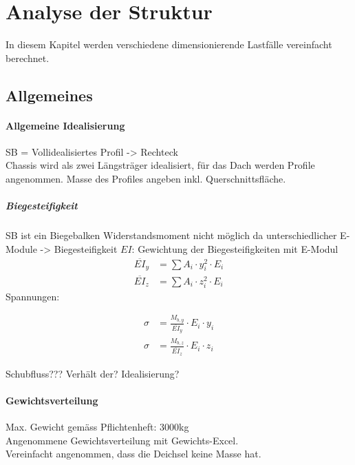 \section{Analyse der Struktur}
In diesem Kapitel werden verschiedene dimensionierende Lastfälle vereinfacht berechnet.

\subsection{Allgemeines}

\paragraph{Allgemeine Idealisierung}
SB = Vollidealisiertes Profil -> Rechteck\\
Chassis wird als zwei Längsträger idealisiert, für das Dach werden Profile angenommen. Masse des Profiles angeben inkl. Querschnittsfläche.

\subparagraph{Biegesteifigkeit}
SB ist ein Biegebalken
Widerstandsmoment nicht möglich da unterschiedlicher E-Module -> Biegesteifigkeit $EI$: Gewichtung der Biegesteifigkeiten mit E-Modul
\begin{equation}
  \label{eq:1}
  \begin{split}
    \overline{EI}_y &= \sum A_i \cdot y_i^2 \cdot E_i\\
    \overline{EI}_z &= \sum A_i \cdot z_i^2 \cdot E_i
  \end{split}
\end{equation}
Spannungen:

\begin{equation}
  \label{eq:2}
  \begin{split}
    \sigma &= \frac{M_{b,y}}{\overline{EI}_y}\cdot E_i \cdot y_i\\
    \sigma &= \frac{M_{b,z}}{\overline{EI}_z}\cdot E_i \cdot z_i
  \end{split}
\end{equation}

Schubfluss??? Verhält der? Idealisierung?

\paragraph{Gewichtsverteilung}
Max. Gewicht gemäss Pflichtenheft: 3000kg\\
Angenommene Gewichtsverteilung mit Gewichts-Excel.\\
Vereinfacht angenommen, dass die Deichsel keine Masse hat.

